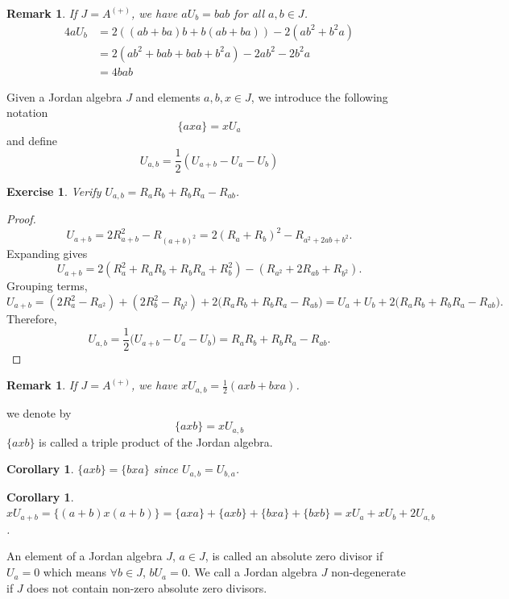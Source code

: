 \documentclass{article}
\newtheorem{corollary}[theorem]{Corollary}
\newtheorem{remark}[theorem]{Remark}
\newtheorem{exercise}[theorem]{Exercise}
\begin{document}
\begin{remark}  
If $J = A^{(+)}$, we have $aU_b = bab$ for all $a, b \in J$.  
\begin{align*}  
    4aU_b &= 2((ab+ba)b + b(ab+ba)) - 2(ab^2+b^2a) \\
    &= 2(ab^2 + bab + bab + b^2a) - 2ab^2 - 2b^2a \\
    &= 4bab  
\end{align*}  
\end{remark}  

Given a Jordan algebra $J$ and elements $a,b,x \in J$, we introduce the following notation  
\[ \{axa\} = xU_a \]  
and define  
\[ U_{a,b} = \frac{1}{2}(U_{a+b} - U_a - U_b) \]  

\begin{exercise}
Verify $ U_{a,b}=R_aR_b+R_bR_a-R_{a  b} $. 
\end{exercise}

\begin{proof} 
\[  
U_{a+b}  
= 2R_{a+b}^2 - R_{(a+b)^2}  
= 2(R_a+R_b)^2 - R_{a^2 + 2ab + b^2}.  
\]  
Expanding gives  
\[  
U_{a+b}  
= 2(R_a^2 + R_aR_b + R_bR_a + R_b^2) - (R_{a^2} + 2R_{ab} + R_{b^2}).  
\]  
Grouping terms,  
\[  
U_{a+b}  
= (2R_a^2 - R_{a^2}) + (2R_b^2 - R_{b^2})  
  + 2\bigl(R_aR_b + R_bR_a - R_{ab}\bigr)  
= U_a + U_b + 2\bigl(R_aR_b + R_bR_a - R_{ab}\bigr).  
\]  
Therefore,  
\[  
U_{a,b} = \frac{1}{2}\bigl(U_{a+b} - U_a - U_b\bigr)  
= R_aR_b + R_bR_a - R_{ab}.  
\]  
\end{proof}

\begin{remark}
If $J = A^{(+)}$, we have $ xU_{a,b}=\frac{1}{2}(axb+bxa) $.
\end{remark}

we denote by  
\[ \{axb\} = xU_{a,b} \]  
$\{axb\}$ is called a triple product of the Jordan algebra. 

\begin{corollary}
$ \{axb\}=\{bxa\} $ since $ U_{a,b}=U_{b,a} $. 
\end{corollary}

\begin{corollary}
$ xU_{a+b}=\{(a+b)x(a+b)\}=\{axa\}+\{axb\} +\{bxa\}+\{bxb\}=xU_a+xU_b+2U_{a,b}$. 
\end{corollary}

\begin{definition}  
An element of a Jordan algebra $J$, $a \in J$, is called an absolute zero divisor if $U_a=0$ which means $ \forall b \in J $, $ bU_a=0 $. We call a Jordan algebra $J$ non-degenerate if $J$ does not contain non-zero absolute zero divisors.  
\end{definition}  
\end{document}
